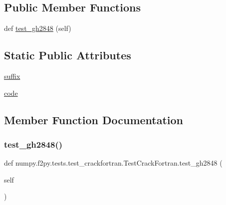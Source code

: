\subsection*{Public Member Functions}
\begin{DoxyCompactItemize}
\item 
def \hyperlink{classnumpy_1_1f2py_1_1tests_1_1test__crackfortran_1_1TestCrackFortran_aba8570880f49af7cd5d6f2e58728b9cb}{test\+\_\+gh2848} (self)
\end{DoxyCompactItemize}
\subsection*{Static Public Attributes}
\begin{DoxyCompactItemize}
\item 
\hyperlink{classnumpy_1_1f2py_1_1tests_1_1test__crackfortran_1_1TestCrackFortran_a1e381db1a36ed5a8b22c8961c3681ac9}{suffix}
\item 
\hyperlink{classnumpy_1_1f2py_1_1tests_1_1test__crackfortran_1_1TestCrackFortran_ac3a6cd38471fa2b9c3e2d8318a435105}{code}
\end{DoxyCompactItemize}


\subsection{Member Function Documentation}
\mbox{\label{classnumpy_1_1f2py_1_1tests_1_1test__crackfortran_1_1TestCrackFortran_aba8570880f49af7cd5d6f2e58728b9cb}} 
\subsubsection{\texorpdfstring{test\+\_\+gh2848()}{test\_gh2848()}}
{\footnotesize\ttfamily def numpy.\+f2py.\+tests.\+test\+\_\+crackfortran.\+Test\+Crack\+Fortran.\+test\+\_\+gh2848 (\begin{DoxyParamCaption}\item[{}]{self }\end{DoxyParamCaption})}



